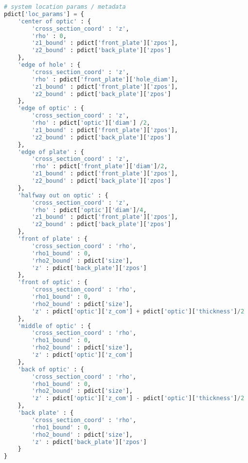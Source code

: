 \begin{spacing}{1}
\begin{lstlisting}[frame=single, language=Python]
# system location params / metadata
pdict['loc_params'] = {
    'center of optic' : {
        'cross_section_coord' : 'z',
        'rho' : 0,
        'z1_bound' : pdict['front_plate']['zpos'],
        'z2_bound' : pdict['back_plate']['zpos']
    },
    'edge of hole' : {
        'cross_section_coord' : 'z',
        'rho' : pdict['front_plate']['hole_diam'],
        'z1_bound' : pdict['front_plate']['zpos'],
        'z2_bound' : pdict['back_plate']['zpos']
    },
    'edge of optic' : {
        'cross_section_coord' : 'z',
        'rho' : pdict['optic']['diam'] /2,
        'z1_bound' : pdict['front_plate']['zpos'],
        'z2_bound' : pdict['back_plate']['zpos']
    },
    'edge of plate' : {
        'cross_section_coord' : 'z',
        'rho' : pdict['front_plate']['diam']/2,
        'z1_bound' : pdict['front_plate']['zpos'],
        'z2_bound' : pdict['back_plate']['zpos']
    },
    'halfway out on optic' : {
        'cross_section_coord' : 'z',
        'rho' : pdict['optic']['diam']/4,
        'z1_bound' : pdict['front_plate']['zpos'],
        'z2_bound' : pdict['back_plate']['zpos']
    },
    'front of plate' : {
        'cross_section_coord' : 'rho',
        'rho1_bound' : 0,
        'rho2_bound' : pdict['size'],
        'z' : pdict['back_plate']['zpos']
    },
    'front of optic' : {
        'cross_section_coord' : 'rho',
        'rho1_bound' : 0,
        'rho2_bound' : pdict['size'],
        'z' : pdict['optic']['z_com'] + pdict['optic']['thickness']/2
    },
    'middle of optic' : {
        'cross_section_coord' : 'rho',
        'rho1_bound' : 0,
        'rho2_bound' : pdict['size'],
        'z' : pdict['optic']['z_com']
    },
    'back of optic' : {
        'cross_section_coord' : 'rho',
        'rho1_bound' : 0,
        'rho2_bound' : pdict['size'],
        'z' : pdict['optic']['z_com'] - pdict['optic']['thickness']/2
    },
    'back plate' : {
        'cross_section_coord' : 'rho',
        'rho1_bound' : 0,
        'rho2_bound' : pdict['size'],
        'z' : pdict['back_plate']['zpos']
    }
}
\end{lstlisting}
\end{spacing}
